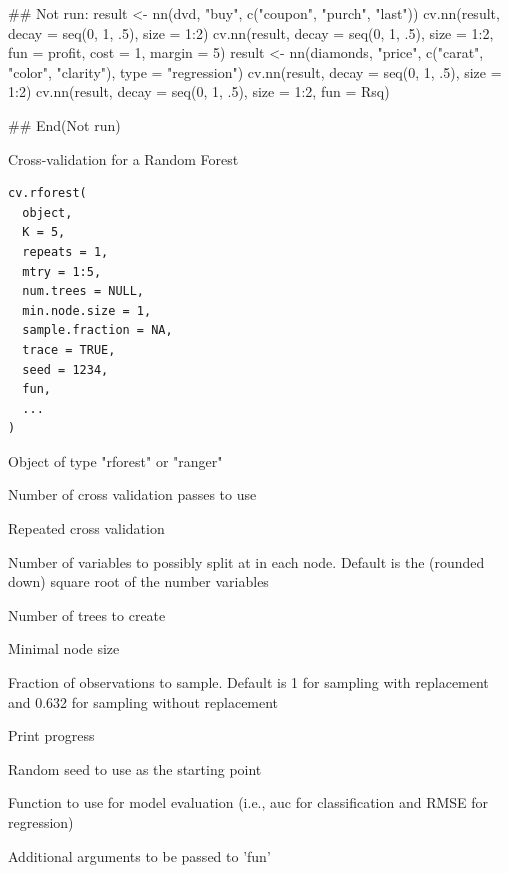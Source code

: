 \documentclass[a4paper]{book}
\begin{document}
%
\begin{Examples}
\begin{ExampleCode}
## Not run: 
result <- nn(dvd, "buy", c("coupon", "purch", "last"))
cv.nn(result, decay = seq(0, 1, .5), size = 1:2)
cv.nn(result, decay = seq(0, 1, .5), size = 1:2, fun = profit, cost = 1, margin = 5)
result <- nn(diamonds, "price", c("carat", "color", "clarity"), type = "regression")
cv.nn(result, decay = seq(0, 1, .5), size = 1:2)
cv.nn(result, decay = seq(0, 1, .5), size = 1:2, fun = Rsq)

## End(Not run)

\end{ExampleCode}
\end{Examples}
%
\begin{Description}
Cross-validation for a Random Forest
\end{Description}
%
\begin{Usage}
\begin{verbatim}
cv.rforest(
  object,
  K = 5,
  repeats = 1,
  mtry = 1:5,
  num.trees = NULL,
  min.node.size = 1,
  sample.fraction = NA,
  trace = TRUE,
  seed = 1234,
  fun,
  ...
)
\end{verbatim}
\end{Usage}
%
\begin{Arguments}
\begin{ldescription}
\item[\code{object}] Object of type "rforest" or "ranger"

\item[\code{K}] Number of cross validation passes to use

\item[\code{repeats}] Repeated cross validation

\item[\code{mtry}] Number of variables to possibly split at in each node. Default is the (rounded down) square root of the number variables

\item[\code{num.trees}] Number of trees to create

\item[\code{min.node.size}] Minimal node size

\item[\code{sample.fraction}] Fraction of observations to sample. Default is 1 for sampling with replacement and 0.632 for sampling without replacement

\item[\code{trace}] Print progress

\item[\code{seed}] Random seed to use as the starting point

\item[\code{fun}] Function to use for model evaluation (i.e., auc for classification and RMSE for regression)

\item[\code{...}] Additional arguments to be passed to 'fun'
\end{ldescription}
\end{Arguments}
\end{document}
